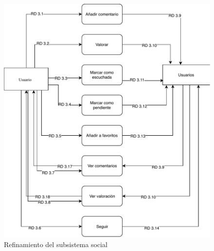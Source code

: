 \begin{figure}[H]
  \caption{Refinamiento del subsistema social}
  \centering
  \includegraphics{diagramas/ref-social.pdf}
\end{figure}


